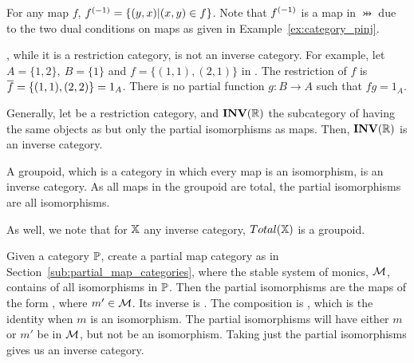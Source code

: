 \begin{example}\label{ex:pinj_is_an_inverse_category}
  For any map $f$, ${f}^{(-1)} = \{(y,x) | (x,y) \in
  f\}$. Note that ${f}^{(-1)}$ is a map in $\pinj$ due to the two dual conditions on maps as given in
  Example~\ref{ex:category_pinj}.
\end{example}
\begin{example}\label{ex:par_is_not_an_inverse_category}
  \Par, while it is a restriction category, is not an inverse category. For example, let
  $A=\{1,2\},\ B=\{1\}$ and $f=\{(1,1),(2,1)\}$ in \Par. The restriction of $f$ is $\overline{f} =
  \{(1,1),(2,2)\} = 1_A$. There is no partial function $g:B\to A$ such that $f g = 1_A$.
\end{example}
\begin{example}\label{ex:partial_isos_are_inverse_category}
  Generally, let \R be a restriction category, and $\mathbf{INV}({\mathbb{R}})$ the subcategory of \R having the same objects
  as \R but only the partial isomorphisms as maps. Then, $\mathbf{INV}({\mathbb{R}})$ is an inverse category.
\end{example}
\begin{example}\label{ex:groupoid_is_inverse_category}
  A groupoid, which is a category in which every map is an isomorphism, is an inverse category. As
  all maps in the groupoid are total, the partial isomorphisms are all  isomorphisms.

  As well, we note that for $\mathbb{X}$ any inverse category, $Total(\mathbb{X})$ is a groupoid.
\end{example}
\begin{example}\label{ex:partial_map_monics_is_inverse_category}
  Given a category $\mathbb{P}$, create a partial map category as in
  Section~\ref{sub:partial_map_categories}, where the stable system of monics, $\mathcal{M}$, contains of
  all  isomorphisms in $\mathbb{P}$. Then the partial isomorphisms are the maps of the form
  , where $m'\in\mathcal{M}$. Its inverse is
  . The composition is
   , which is the
  identity when $m$ is an isomorphism. The partial isomorphisms will have either $m$ or $m'$ be in
  $\mathcal{M}$, but not be an isomorphism. Taking just the partial isomorphisms gives us an inverse
  category.
\end{example}

